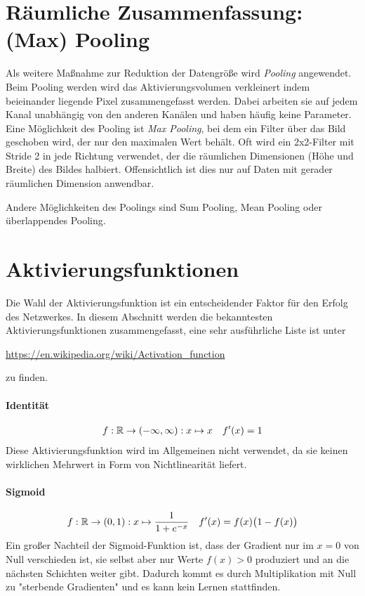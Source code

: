 	\section{Räumliche Zusammenfassung: (Max) Pooling}
		Als weitere Maßnahme zur Reduktion der Datengröße wird \emph{Pooling} angewendet. Beim Pooling werden wird das Aktivierungsvolumen verkleinert indem beieinander liegende Pixel zusammengefasst werden. Dabei arbeiten sie auf jedem Kanal unabhängig von den anderen Kanälen und haben häufig keine Parameter. Eine Möglichkeit des Pooling ist \emph{Max Pooling}, bei dem ein Filter über das Bild geschoben wird, der nur den maximalen Wert behält. Oft wird ein 2x2-Filter mit Stride 2 in jede Richtung verwendet, der die räumlichen Dimensionen (Höhe und Breite) des Bildes halbiert. Offensichtlich ist dies nur auf Daten mit gerader räumlichen Dimension anwendbar.

		Andere Möglichkeiten des Poolings sind \zB Sum Pooling, Mean Pooling oder überlappendes Pooling.

	\section{Aktivierungsfunktionen}
		\label{sec:activationFunctions}

		Die Wahl der Aktivierungsfunktion ist ein entscheidender Faktor für den Erfolg des Netzwerkes. In diesem Abschnitt werden die bekanntesten Aktivierungsfunktionen zusammengefasst, eine sehr ausführliche Liste ist unter
		\begin{center}
			\url{https://en.wikipedia.org/wiki/Activation_function}
		\end{center}
		zu finden.

		\paragraph{Identität}
			\begin{align}
				f : \mathbb{R} \to (-\infty, \infty) : x \mapsto x &&
				f'(x) = 1
			\end{align}
			Diese Aktivierungsfunktion wird im Allgemeinen nicht verwendet, da sie keinen wirklichen Mehrwert in Form von Nichtlinearität liefert.

		\paragraph{Sigmoid}
			\begin{align}
				f : \mathbb{R} \to (0, 1) : x \mapsto \frac{1}{1 + e^{-x}} &&
				f'(x) = f(x) \big( 1 - f(x) \big)
			\end{align}
			Ein großer Nachteil der Sigmoid-Funktion ist, dass der Gradient nur im \( x = 0 \) von Null verschieden ist, sie selbst aber nur Werte \( f(x) > 0 \) produziert und an die nächsten Schichten weiter gibt. Dadurch kommt es durch Multiplikation mit Null zu "sterbende Gradienten" und es kann kein Lernen stattfinden.

